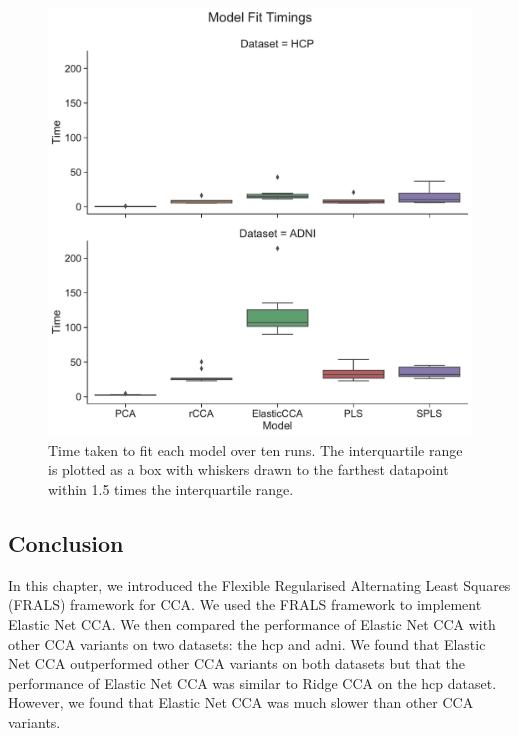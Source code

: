 \begin{figure}
    \centering
    \includegraphics[width=0.8\linewidth]{figures/model_fit_timings}
    \caption{Time taken to fit each model over ten runs. The interquartile range is plotted as a box with whiskers drawn to the farthest datapoint within 1.5 times the interquartile range.}\label{fig:timings}
\end{figure}

\subsection{Conclusion}

In this chapter, we introduced the Flexible Regularised Alternating Least Squares (FRALS) framework for CCA\@.
We used the FRALS framework to implement Elastic Net CCA\@.
We then compared the performance of Elastic Net CCA with other CCA variants on two datasets: the \acrshort{hcp} and \acrshort{adni}.
We found that Elastic Net CCA outperformed other CCA variants on both datasets but that the performance of Elastic Net CCA was similar to Ridge CCA on the \acrshort{hcp} dataset.
However, we found that Elastic Net CCA was much slower than other CCA variants.
